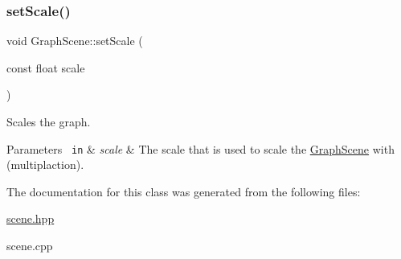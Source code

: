 \subsubsection{\texorpdfstring{setScale()}{setScale()}}
{\footnotesize\ttfamily void Graph\+Scene\+::set\+Scale (\begin{DoxyParamCaption}\item[{const float}]{scale }\end{DoxyParamCaption})}



Scales the graph. 


\begin{DoxyParams}[1]{Parameters}
\mbox{\texttt{ in}}  & {\em scale} & The scale that is used to scale the \mbox{\hyperlink{class_graph_scene}{Graph\+Scene}} with (multiplaction). \\
\hline
\end{DoxyParams}


The documentation for this class was generated from the following files\+:\begin{DoxyCompactItemize}
\item 
\mbox{\hyperlink{scene_8hpp}{scene.\+hpp}}\item 
scene.\+cpp\end{DoxyCompactItemize}
